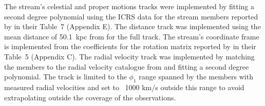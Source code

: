 The stream's celestial and proper motions tracks were implemented by fitting a second degree polynomial using the ICRS data for the stream members reported by \citet{Shipp2019} in their Table~7 (Appendix E). The distance track was implemented using the mean distance of 50.1~kpc from \citet{Shipp2018} for the full track. The stream's coordinate frame is implemented from the coefficients for the rotation matrix reported by \citet{Shipp2019} in their Table~5 (Appendix C). The radial velocity track was implemented by matching the \citet{Shipp2019} members to the radial velocity catalogue from \citet{Li2022} and fitting a second degree polynomial. The track is limited to the $\phi_1$ range spanned by the members with measured radial velocities and set to ~1000 km/s outside this range to avoid extrapolating outside the coverage of the observations.
